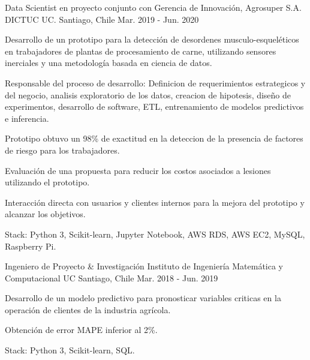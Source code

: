 

\begin{cventries}


\cventry
{Data Scientist en proyecto conjunto con Gerencia de Innovación, Agrosuper S.A.} %
{DICTUC UC.} %
{Santiago, Chile} %
{Mar. 2019 - Jun. 2020} %
{
  \begin{cvitems} %
    \item {Desarrollo de un prototipo para la detección de desordenes musculo-esqueléticos en trabajadores de plantas de procesamiento de carne,
    utilizando sensores inerciales y una metodología basada en ciencia de datos.}
    \item{Responsable del proceso de desarrollo: Definicion de requerimientos estrategicos y del negocio, analisis
    exploratorio de los datos, creacion de hipotesis, diseño de experimentos, desarrollo de software, ETL, entrenamiento de modelos predictivos e inferencia.}
    \item{Prototipo obtuvo un 98\% de exactitud en la deteccion de la presencia de factores de riesgo para los trabajadores.}
    \item {Evaluación de una propuesta para reducir los costos asociados a lesiones utilizando el prototipo.}
    \item {Interacción directa con usuarios y clientes internos para la mejora del prototipo y alcanzar los objetivos.}
    \item {Stack: Python 3, Scikit-learn, Jupyter Notebook, AWS RDS, AWS EC2, MySQL, Raspberry Pi.}
  \end{cvitems}
}
\cventry
{Ingeniero de Proyecto \& Investigación} %
{Instituto de Ingeniería Matemática y Computacional UC}
{Santiago, Chile} %
{Mar. 2018 - Jun. 2019} %
{
  \begin{cvitems} %
    \item {Desarrollo de un modelo predictivo para pronosticar variables criticas en la operación de clientes de la industria agrícola.}
    \item {Obtención de error MAPE inferior al 2\%.}
    \item {Stack: Python 3, Scikit-learn, SQL.}
  \end{cvitems}
}


\end{cventries}

